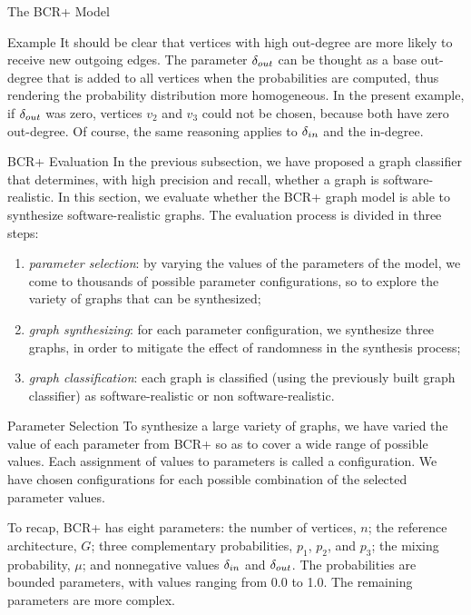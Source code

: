 \documentclass[11pt,twocolumn,a4paper,english]{article}
\begin{document}
\begin{section}{The BCR+ Model}
\begin{subsection}{Example}
	It should be clear that vertices with high out-degree are more likely to receive new outgoing edges. The parameter $\delta_{out}$ can be thought as a base out-degree that is added to all vertices when the probabilities are computed, thus rendering the probability distribution more homogeneous. In the present example, if $\delta_{out}$ was zero, vertices $v_2$ and $v_3$ could not be chosen, because both have zero out-degree. Of course, the same reasoning applies to $\delta_{in}$ and the in-degree.

\end{subsection}
	
\begin{subsection}{BCR+ Evaluation}
	In the previous subsection, we have proposed a graph classifier that determines, with high precision and recall, whether a graph is software-realistic. In this section, we evaluate whether the BCR+ graph model is able to synthesize software-realistic graphs. The evaluation process is divided in three steps:
	
	\begin{enumerate}
		\item \emph{parameter selection}: by varying the values of the parameters of the model, we come to thousands of possible parameter configurations, so to explore the variety of graphs that can be synthesized;
		
		\item \emph{graph synthesizing}: for each parameter configuration, we synthesize three graphs, in order to mitigate the effect of randomness in the synthesis process;
		
		\item \emph{graph classification}: each graph is classified (using the previously built graph classifier) as software-realistic or non software-realistic.
	\end{enumerate}
	
\begin{subsubsection}{Parameter Selection}
	To synthesize a large variety of graphs, we have varied the value of each parameter from BCR+ so as to cover a wide range of possible values. Each assignment of values to parameters is called a configuration. We have chosen configurations for each possible combination of the selected parameter values.
		
	To recap, BCR+ has eight parameters: the number of vertices, $n$; the reference architecture, $G$; three complementary probabilities, $p_1$, $p_2$, and $p_3$; the mixing probability, $\mu$; and nonnegative values $\delta_{in}$ and $\delta_{out}$. The probabilities are bounded parameters, with values ranging from 0.0 to 1.0. The remaining parameters are more complex.
	

\end{subsubsection}
\end{subsection}
\end{section}
\end{document}
